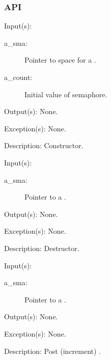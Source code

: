 \subsubsection{API}
\begin{capi}
\label{sma_new}
	\begin{capilist}
	\item[Input(s): ]
		\begin{description}\item[]
		\item[a\_sma: ]
			Pointer to space for a .
		\item[a\_count: ]
			Initial value of semaphore.
		\end{description}
	\item[Output(s): ] None.
	\item[Exception(s): ] None.
	\item[Description: ]
		Constructor.
	\end{capilist}
\label{sma_delete}
	\begin{capilist}
	\item[Input(s): ]
		\begin{description}\item[]
		\item[a\_sma: ]
			Pointer to a \classname{sma}.
		\end{description}
	\item[Output(s): ] None.
	\item[Exception(s): ] None.
	\item[Description: ]
		Destructor.
	\end{capilist}
\label{sma_post}
	\begin{capilist}
	\item[Input(s): ]
		\begin{description}\item[]
		\item[a\_sma: ]
			Pointer to a .
		\end{description}
	\item[Output(s): ] None.
	\item[Exception(s): ] None.
	\item[Description: ]
		Post (increment) \cvar{a\_sma}.
	\end{capilist}

\end{capi}
